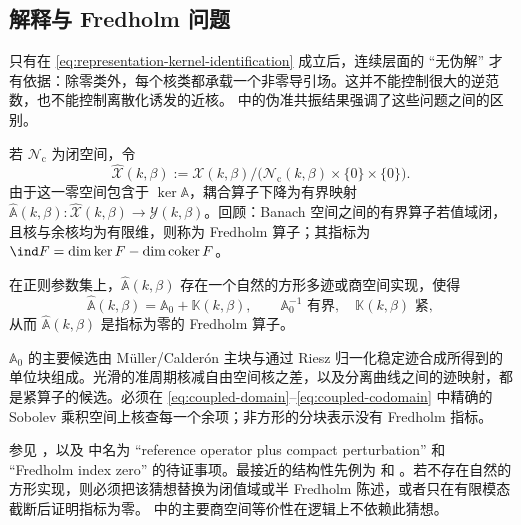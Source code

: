 \subsection{解释与 Fredholm 问题}

只有在 \eqref{eq:representation-kernel-identification} 成立后，连续层面的 ``无伪解'' 才有依据：除零类外，每个核类都承载一个非零导引场。这并不能控制很大的逆范数，也不能控制离散化诱发的近核。\cite[Theorems~1.10--1.12]{HiptmairMoiolaSpence2022} 中的伪准共振结果强调了这些问题之间的区别。

若 $\mathcal N_{\mathrm c}$ 为闭空间，令
\[
  \widehat{\mathcal X}(k,\beta):=
  \mathcal X(k,\beta)/
  \bigl(\mathcal N_{\mathrm c}(k,\beta)\times\{0\}\times\{0\}\bigr).
\]
由于这一零空间包含于 $\ker\mathbb A$，耦合算子下降为有界映射 $\widehat{\mathbb A}(k,\beta):\widehat{\mathcal X}(k,\beta)\to\mathcal Y(k,\beta)$。回顾：Banach 空间之间的有界算子若值域闭，且核与余核均为有限维，则称为 Fredholm 算子；其指标为 $\ind F=\dim\ker F-\dim\operatorname{coker}F$。

\begin{conjecture}
\label{conj:Fredholm}
在正则参数集上，$\widehat{\mathbb A}(k,\beta)$ 存在一个自然的方形多迹或商空间实现，使得
\begin{equation}
  \widehat{\mathbb A}(k,\beta)
  =\mathbb A_0+\mathbb K(k,\beta),
  \qquad \mathbb A_0^{-1}\text{ 有界},\quad
  \mathbb K(k,\beta)\text{ 紧},
  \label{eq:Fredholm-splitting}
\end{equation}
从而 $\widehat{\mathbb A}(k,\beta)$ 是指标为零的 Fredholm 算子。
\end{conjecture}
\begin{proofroadmap}
$\mathbb A_0$ 的主要候选由 M\"uller/Calder\'on 主块与通过 Riesz 归一化稳定迹合成所得到的单位块组成。光滑的准周期核减自由空间核之差，以及分离曲线之间的迹映射，都是紧算子的候选。必须在 \eqref{eq:coupled-domain}--\eqref{eq:coupled-codomain} 中精确的 Sobolev 乘积空间上核查每一个余项；非方形的分块表示没有 Fredholm 指标。

参见 ，以及  中名为 ``reference operator plus compact perturbation'' 和 ``Fredholm index zero'' 的待证事项。最接近的结构性先例为 \cite[Theorem~4]{BarnettGreengard2010} 和 \cite[Lemma~5.1]{HohageSoussi2013}。若不存在自然的方形实现，则必须把该猜想替换为闭值域或半 Fredholm 陈述，或者只在有限模态截断后证明指标为零。 中的主要商空间等价性在逻辑上不依赖此猜想。
\end{proofroadmap}
